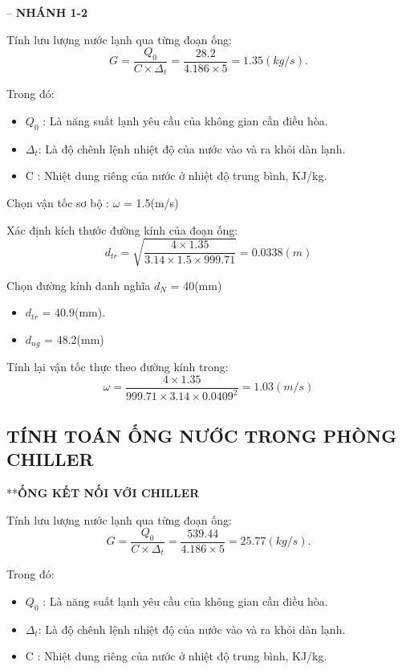 -- \textbf{NHÁNH 1-2}

Tính lưu lượng nước lạnh qua từng đoạn ống:
\begin{equation*}
	G = \dfrac{Q_{0}}{C \times \Delta_{t}} =\dfrac{28.2}{4.186 \times 5} = 1.35(kg/s).
\end{equation*}

Trong đó:
\begin{itemize}
	\item $Q_{0}$ : Là năng suất lạnh yêu cầu của không gian cần điều hòa.
	\item $\Delta_{t}$: Là độ chênh lệnh nhiệt độ của nước vào và ra khỏi dàn lạnh.
	\item C : Nhiệt dung riêng của nước ở nhiệt độ trung bình, KJ/kg.
\end{itemize}

Chọn vận tốc sơ bộ : $\omega$ = 1.5(m/s)

Xác định kích thước đường kính của đoạn ống:
\begin{equation*}
	d_{tr} = \sqrt{\dfrac{4 \times 1.35}{3.14 \times 1.5 \times 999.71}} = 0.0338(m)
\end{equation*}

Chọn đường kính danh nghĩa $d_{N}$ = 40(mm)
\begin{itemize}
	\item $d_{tr}$ = 40.9(mm).
	\item $d_{ng}$ = 48.2(mm)
\end{itemize}

Tính lại vận tốc thực theo đường kính trong:
\begin{equation*}
	\omega = \dfrac{4 \times 1.35 }{999.71 \times 3.14 \times 0.0409^{2}} = 1.03(m/s)
\end{equation*}

\subsection{TÍNH TOÁN ỐNG NƯỚC TRONG PHÒNG CHILLER}

**\textbf{ỐNG KẾT NỐI VỚI CHILLER}

Tính lưu lượng nước lạnh qua từng đoạn ống:
\begin{equation*}
	G = \dfrac{Q_{0}}{C \times \Delta_{t}} =\dfrac{539.44}{4.186 \times 5} = 25.77(kg/s).
\end{equation*}

Trong đó:
\begin{itemize}
	\item $Q_{0}$ : Là năng suất lạnh yêu cầu của không gian cần điều hòa.
	\item $\Delta_{t}$: Là độ chênh lệnh nhiệt độ của nước vào và ra khỏi dàn lạnh.
	\item C : Nhiệt dung riêng của nước ở nhiệt độ trung bình, KJ/kg.
\end{itemize}

